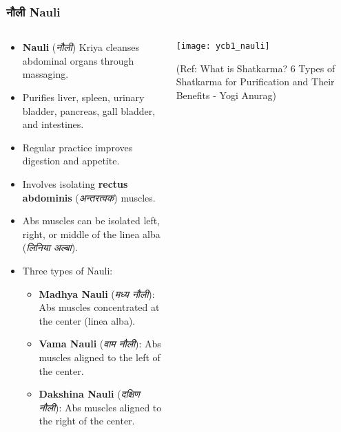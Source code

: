 \begin{frame}[fragile]\frametitle{नौली Nauli}
\begin{columns}
    \begin{column}[T]{0.6\linewidth}
      \begin{itemize}
          \item \textbf{Nauli} (\textit{नौली}) Kriya cleanses abdominal organs through massaging.
          \item Purifies liver, spleen, urinary bladder, pancreas, gall bladder, and intestines.
          \item Regular practice improves digestion and appetite.
          \item Involves isolating \textbf{rectus abdominis} (\textit{अन्तरत्वक}) muscles.
          \item Abs muscles can be isolated left, right, or middle of the linea alba (\textit{लिनिया अल्बा}).
          \item Three types of Nauli:
            \begin{itemize}
              \item \textbf{Madhya Nauli} (\textit{मध्य नौली}): Abs muscles concentrated at the center (linea alba).
              \item \textbf{Vama Nauli} (\textit{वाम नौली}): Abs muscles aligned to the left of the center.
              \item \textbf{Dakshina Nauli} (\textit{दक्षिण नौली}): Abs muscles aligned to the right of the center.
            \end{itemize}
      \end{itemize}
    \end{column}
    \begin{column}[T]{0.4\linewidth}
        \begin{center}
        \texttt{[image: ycb1\_nauli]}
		
		{\tiny (Ref: What is Shatkarma? 6 Types of Shatkarma for Purification and Their Benefits - Yogi Anurag)}	
        \end{center}	
    \end{column}
\end{columns}	  
\end{frame}


